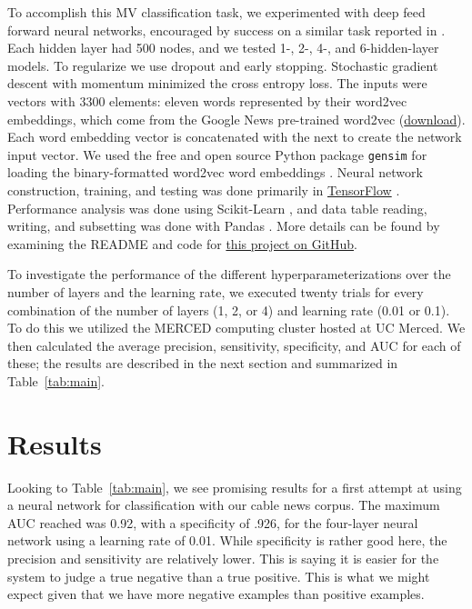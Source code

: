 \documentclass[11pt,letterpaper]{amsart}
\begin{document}
To accomplish this MV classification task, we experimented with deep
feed forward neural networks, encouraged by success on a similar task reported in
\cite{DoDinh2016}. Each hidden layer had 500 nodes, and we
tested 1-, 2-, 4-, and 6-hidden-layer models. To regularize we use
dropout and early stopping. Stochastic gradient descent with momentum
minimized the cross entropy loss. The inputs were vectors with 3300
elements: eleven words represented by their word2vec embeddings, which
come from the Google News pre-trained word2vec 
(\href{https://github.com/mmihaltz/word2vec-GoogleNews-vectors/raw/master/GoogleNews-vectors-negative300.bin.gz}{download}).
Each word embedding vector is concatenated with the next to create the
network input vector. We used the free and open source Python package 
\texttt{gensim} for loading the binary-formatted word2vec 
\cite{Mikolov2013, Mikolov2013a} word embeddings \cite{Rehurek2010}.
Neural network construction, training, and testing was done primarily in
\href{https://www.tensorflow.org/}{TensorFlow} 
\cite{GoogleResearch2015, Abadi2016a}. Performance 
analysis was done using Scikit-Learn \cite{Pedregosa2011}, 
and data table reading, writing, and 
subsetting was done with Pandas \cite{McKinney2013}. 
More details can be found by examining the
README and code for 
\href{https://github.com/mtpain/math292-fall17-project}{this project on GitHub}.

To investigate the performance of the different hyperparameterizations over
the number of layers and the learning rate, we executed twenty trials for
every combination of the number of layers (1, 2, or 4) and learning rate
(0.01 or 0.1). To do this we utilized the MERCED computing cluster hosted
at UC Merced. We then calculated the average precision, sensitivity, specificity,
and AUC for each of these; the results are described in the next section and
summarized in Table~\ref{tab:main}.

\section{Results}\label{results}

Looking to Table~\ref{tab:main}, we see promising results for a first attempt
at using a neural network for classification with our cable news corpus. 
The maximum AUC reached was 0.92, with a specificity of .926, for 
the four-layer neural network using a learning rate of 0.01. While specificity
is rather good here, the precision and sensitivity are relatively lower.
This is saying it is easier for the system to judge a 
true negative than a true positive. This is what we might expect given that we 
have more negative examples than positive examples. 
\end{document}

